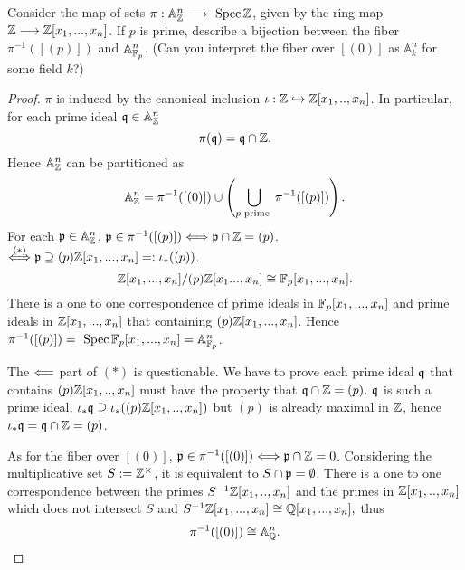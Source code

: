 \begin{exr}
Consider the map of sets $\pi: \mathbb{A}^n_\mathbb Z \longrightarrow  \text{ Spec\,} \mathbb Z$,
given by the ring map $\mathbb Z \longrightarrow \mathbb Z[x_1,..., x_n]$. If $p$ is prime, describe a bijection between the fiber $\pi^{-1}([(p)])$ and $\mathbb{A}^n_{\mathbb F_p}$.
(Can you interpret the fiber over $[(0)]$ as $\mathbb{A}^n_{k}$ for some field $k$?)
\end{exr}
\begin{proof}
$\pi$ is induced by the canonical inclusion $\iota:\mathbb Z\hookrightarrow \mathbb Z[x_1,..,x_n]$. In particular, for each prime ideal $\mathfrak q\in \mathbb{A}^n_\mathbb Z$
$$
\pi(\mathfrak q)=\mathfrak q\cap\mathbb Z.
$$
Hence $\mathbb{A}^{n}_\mathbb Z$ can be partitioned as 
$$\mathbb{A}^n_\mathbb Z
=\pi^{-1}([(0)])\cup \left(\bigcup_{p\text{ prime }}\pi^{-1}([(p)])\right).
$$
For each ${\mathfrak p}\in \mathbb{A}^n_\mathbb Z$, ${\mathfrak p}\in \pi^{-1}([(p)])\Longleftrightarrow {\mathfrak p}\cap\mathbb Z=(p)$.\\
$\overset{(*)}{\Longleftrightarrow}{\mathfrak p}\supseteq (p)\mathbb Z[x_1,...,x_n]=:\iota_*((p))$.
$$
\mathbb Z[x_1,...,x_n]/(p)\mathbb Z[x_1...,x_n]\cong \mathbb F_p[x_1,...,x_n].
$$
There is a one to one correspondence of prime ideals in $\mathbb F_p[x_1,...,x_n]$ and prime ideals in $\mathbb Z[x_1,...,x_n]$ that containing $(p)\mathbb Z[x_1,...,x_n]$. Hence $\pi^{-1}([(p)])=\text{ Spec\,} \mathbb F_p[x_1,...,x_n]=\mathbb A_{\mathbb F_p}^n$.

The $\Longleftarrow$ part of $(*)$ is questionable. We have to prove each prime ideal $\mathfrak q$ that contains $(p)\mathbb Z[x_1,..,x_n]$ must have the property that $\mathfrak q\cap\mathbb Z=(p)$. $\mathfrak q$ is such a prime ideal, $\iota_*\mathfrak q\supseteq\iota_*((p)\mathbb Z[x_1,..,x_n])$ but $(p)$ is already maximal in $\mathbb Z$, hence $\iota_*\mathfrak q=\mathfrak q\cap\mathbb Z=(p)$.

As for the fiber over $[(0)]$, ${\mathfrak p}\in\pi^{-1}([(0)])\Longleftrightarrow {\mathfrak p}\cap \mathbb Z=0$.
 Considering the multiplicative set $S:=\mathbb Z^\times$, it is equivalent to $S\cap{\mathfrak p}=\emptyset$. There is a one to one correspondence between the primes $S^{-1}\mathbb Z[x_1,..,x_n]$ and the primes in $\mathbb Z[x_1,..,x_n]$ which does not intersect $S$ and 
 $
S^{-1}\mathbb Z[x_1,...,x_n]\cong \mathbb Q[x_1,...,x_n],
 $   
 thus 
 $$
\pi^{-1}([(0)])\cong \mathbb A^n_\mathbb Q.
 $$

\end{proof}

